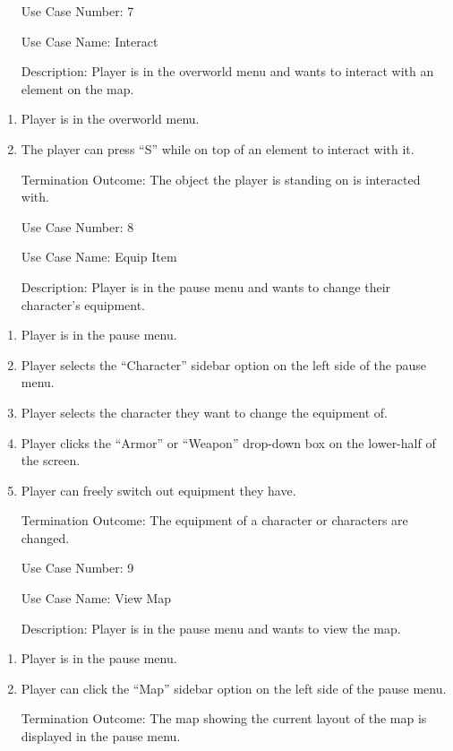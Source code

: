 \documentclass[10pt,conference,onecolumn,compsoc]{IEEEtran}
\begin{document}
\begin{itemize}
\item[Use Case Number:] 7
\item[Use Case Name:] Interact
\item[Description:] Player is in the overworld menu and wants to interact with an element on the map.
\end{itemize}
\begin{enumerate}
\item Player is in the overworld menu.
\item The player can press “S” while on top of an element to interact with it.
\item [Termination Outcome:] The object the player is standing on is interacted with.
\end{enumerate}

\begin{itemize}
\item[Use Case Number:] 8
\item[Use Case Name:] Equip Item
\item[Description:] Player is in the pause menu and wants to change their character's equipment.
\end{itemize}
\begin{enumerate}
\item Player is in the pause menu.
\item Player selects the “Character” sidebar option on the left side of the pause menu.
\item Player selects the character they want to change the equipment of.
\item Player clicks the “Armor” or “Weapon” drop-down box on the lower-half of the screen.
\item Player can freely switch out equipment they have.
\item [Termination Outcome:] The equipment of a character or characters are changed.
\end{enumerate}

\begin{itemize}
\item[Use Case Number:] 9
\item[Use Case Name:] View Map
\item[Description:] Player is in the pause menu and wants to view the map.
\end{itemize}
\begin{enumerate}
\item Player is in the pause menu.
\item Player can click the “Map” sidebar option on the left side of the pause menu.
\item [Termination Outcome:] The map showing the current layout of the map is displayed in the pause menu.
\end{enumerate}
\end{document}
